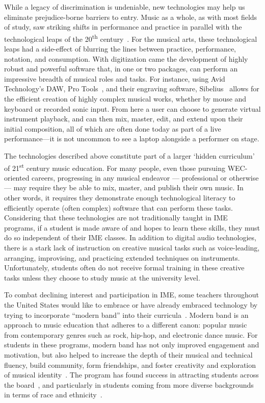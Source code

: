 \documentclass[manuscript,screen,review]{acmart}
\begin{document}
While a legacy of discrimination is undeniable, new technologies may help us eliminate prejudice-borne barriers to entry.
Music as a whole, as with most fields of study, saw striking shifts in performance and practice in parallel with the technological leaps of the 20\textsuperscript{th} century~\cite{Katz10}.
For the musical arts, these technological leaps had a side-effect of blurring the lines between practice, performance, notation, and consumption.
With digitization came the development of highly robust and powerful software that, in one or two packages, can perform an impressive breadth of musical roles and tasks.
For instance, using Avid Technology’s DAW, Pro Tools~\cite{ProTools}, and their engraving software, Sibelius~\cite{Sibelius} allows for the efficient creation of highly complex musical works, whether by mouse and keyboard or recorded sonic input.
From here a user can choose to generate virtual instrument playback, and can then mix, master, edit, and extend upon their initial composition, all of which are often done today as part of a live performance---it is not uncommon to see a laptop alongside a performer on stage. 

The technologies described above constitute part of a larger `hidden curriculum' of 21\textsuperscript{st} century music education. 
For many people, even those pursuing WEC-oriented careers, progressing in any musical endeavor --- professional or otherwise --- may require they be able to mix, master, and publish their own music.
In other words, it requires they demonstrate enough technological literacy to efficiently operate (often complex) software that can perform these tasks.
Considering that these technologies are not traditionally taught in IME programs, if a student is made aware of and hopes to learn these skills, they must do so independent of their IME classes.
In addition to digital audio technologies, there is a stark lack of instruction on creative musical tasks such as voice-leading, arranging, improvising, and practicing extended techniques on instruments.
Unfortunately, students often do not receive formal training in these creative tasks unless they choose to study music at the university level.

To combat declining interest and participation in IME, some teachers throughout the United States would like to embrace or have already embraced technology by trying to incorporate ``modern band'' into their curricula~\cite{Dammers}.
Modern band is an approach to music education that adheres to a different canon: popular music from contemporary genres such as rock, hip-hop, and electronic dance music.
For students in these programs, modern band has not only improved engagement and motivation, but also helped to increase the depth of their musical and technical fluency, build community, form friendships, and foster creativity and exploration of musical identity~\cite{Vasil23}.
The program has found success in attracting students across the board~\cite{NelsonKelly}, and particularly in students coming from more diverse backgrounds in terms of race and ethnicity~\cite{Vasil23}.
\end{document}
